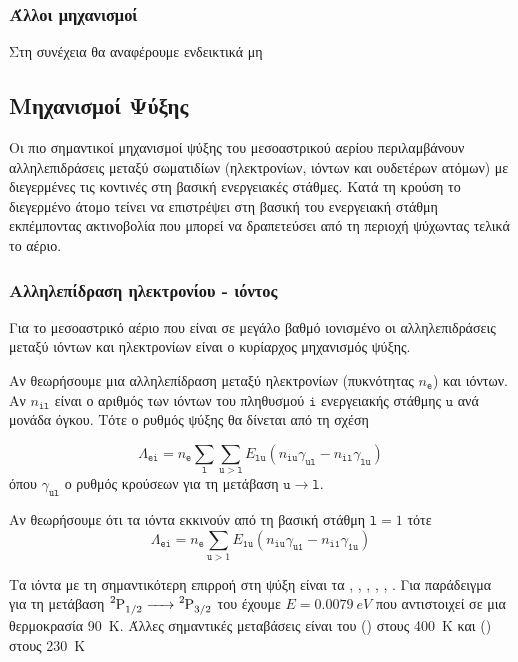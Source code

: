  
\subsubsection{Άλλοι μηχανισμοί}
Στη συνέχεια θα αναφέρουμε ενδεικτικά μη
 
 
\subsection{Μηχανισμοί Ψύξης}
Οι πιο σημαντικοί μηχανισμοί ψύξης του μεσοαστρικού αερίου περιλαμβάνουν αλληλεπιδράσεις μεταξύ σωματιδίων (ηλεκτρονίων, ιόντων και ουδετέρων ατόμων) με διεγερμένες τις κοντινές στη βασική ενεργειακές στάθμες. Κατά τη κρούση το διεγερμένο άτομο τείνει να επιστρέψει στη βασική του ενεργειακή στάθμη εκπέμποντας ακτινοβολία που μπορεί να δραπετεύσει από τη περιοχή ψύχωντας τελικά το αέριο. 

\subsubsection{Αλληλεπίδραση ηλεκτρονίου - ιόντος}
Για το μεσοαστρικό αέριο που είναι σε μεγάλο βαθμό ιονισμένο οι αλληλεπιδράσεις μεταξύ ιόντων και ηλεκτρονίων είναι ο κυρίαρχος μηχανισμός ψύξης.

Αν θεωρήσουμε μια αλληλεπίδραση μεταξύ ηλεκτρονίων (πυκνότητας $n_\mathtt{e}$) και ιόντων. Αν $n_\mathtt{il}$ είναι ο αριθμός των ιόντων του πληθυσμού $\mathtt{i}$ ενεργειακής στάθμης $\mathtt{u}$ ανά μονάδα όγκου. Τότε ο ρυθμός ψύξης θα δίνεται από τη σχέση


\begin{equation}
\Lambda _\mathtt{ei} = n_\mathtt{e} \sum_{\mathtt{l}} \sum_{\mathtt{u}>\mathtt{l}} E_\mathtt{lu} 
(n_\mathtt{iu} \gamma _\mathtt{ul} - n_\mathtt{il} \gamma _\mathtt{lu}) 
\end{equation}
όπου $\gamma _\mathtt{ul}$ ο ρυθμός κρούσεων για τη μετάβαση $\mathtt{u} \rightarrow \mathtt{l}$.

Αν θεωρήσουμε ότι τα ιόντα εκκινούν από τη βασική στάθμη $\mathtt{l}=1$ τότε  
\begin{equation}
\Lambda _\mathtt{ei} = n_\mathtt{e} \sum_{\mathtt{u}>1} E_\mathtt{1u} 
(n_\mathtt{iu} \gamma _\mathtt{u1} - n_\mathtt{i1} \gamma _\mathtt{1u}) 
\end{equation}

Τα ιόντα με τη σημαντικότερη επιρροή στη ψύξη είναι τα , , , , , . Για παράδειγμα για τη μετάβαση $\ce{^2P1/2 -> ^2P3/2}$ του  έχουμε $Ε=\SI{0.0079}{eV}$ που αντιστοιχεί σε μια θερμοκρασία \SI{90}{K}. Άλλες σημαντικές μεταβάσεις είναι του  () στους \SI{400}{K} και  () στους \SI{230}{K}

